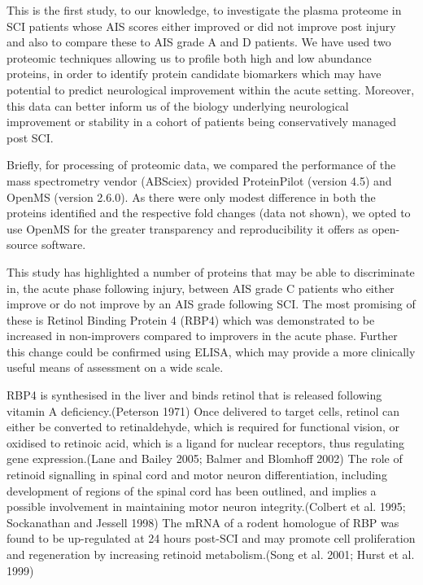 \documentclass[9pt,lineno]{elife}
\begin{document}
\begin{landscape}
\begin{landscape}
This is the first study, to our knowledge, to investigate the plasma proteome in SCI patients whose AIS scores either improved or did not improve post injury and also to compare these to AIS grade A and D patients.
We have used two proteomic techniques allowing us to profile both high and low abundance proteins, in order to identify protein candidate biomarkers which may have potential to predict neurological improvement within the acute setting.
Moreover, this data can better inform us of the biology underlying neurological improvement or stability in a cohort of patients being conservatively managed post SCI.

Briefly, for processing of proteomic data, we compared the performance of the mass spectrometry vendor (ABSciex) provided ProteinPilot (version 4.5) and OpenMS (version 2.6.0).
As there were only modest difference in both the proteins identified and the respective fold changes (data not shown), we opted to use OpenMS for the greater transparency and reproducibility it offers as open-source software.

This study has highlighted a number of proteins that may be able to discriminate in, the acute phase following injury, between AIS grade C patients who either improve or do not improve by an AIS grade following SCI.
The most promising of these is Retinol Binding Protein 4 (RBP4) which was demonstrated to be increased in non-improvers compared to improvers in the acute phase.
Further this change could be confirmed using ELISA, which may provide a more clinically useful means of assessment on a wide scale.

RBP4 is synthesised in the liver and binds retinol that is released following vitamin A deficiency.(Peterson 1971) Once delivered to target cells, retinol can either be converted to retinaldehyde, which is required for functional vision, or oxidised to retinoic acid, which is a ligand for nuclear receptors, thus regulating gene expression.(Lane and Bailey 2005; Balmer and Blomhoff 2002) The role of retinoid signalling in spinal cord and motor neuron differentiation, including development of regions of the spinal cord has been outlined, and implies a possible involvement in maintaining motor neuron integrity.(Colbert et al. 1995; Sockanathan and Jessell 1998) The mRNA of a rodent homologue of RBP was found to be up-regulated at 24 hours post-SCI and may promote cell proliferation and regeneration by increasing retinoid metabolism.(Song et al. 2001; Hurst et al. 1999)


\end{landscape}
\end{landscape}
\end{document}
